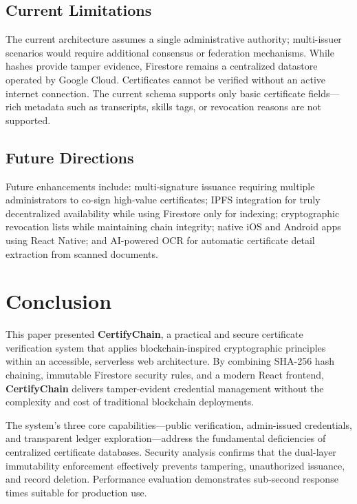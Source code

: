 \documentclass[10pt,twocolumn,a4paper]{article}
\newcommand{\certifychain}{\textbf{CertifyChain}}
\begin{document}
\subsection{Current Limitations}

The current architecture assumes a single administrative authority; multi-issuer scenarios would require additional consensus or federation mechanisms. While hashes provide tamper evidence, Firestore remains a centralized datastore operated by Google Cloud. Certificates cannot be verified without an active internet connection. The current schema supports only basic certificate fields---rich metadata such as transcripts, skills tags, or revocation reasons are not supported.

\subsection{Future Directions}

Future enhancements include: multi-signature issuance requiring multiple administrators to co-sign high-value certificates; IPFS integration for truly decentralized availability while using Firestore only for indexing; cryptographic revocation lists while maintaining chain integrity; native iOS and Android apps using React Native; and AI-powered OCR for automatic certificate detail extraction from scanned documents.

\section{Conclusion}

This paper presented \certifychain{}, a practical and secure certificate verification system that applies blockchain-inspired cryptographic principles within an accessible, serverless web architecture. By combining SHA-256 hash chaining, immutable Firestore security rules, and a modern React frontend, \certifychain{} delivers tamper-evident credential management without the complexity and cost of traditional blockchain deployments.

The system's three core capabilities---public verification, admin-issued credentials, and transparent ledger exploration---address the fundamental deficiencies of centralized certificate databases. Security analysis confirms that the dual-layer immutability enforcement effectively prevents tampering, unauthorized issuance, and record deletion. Performance evaluation demonstrates sub-second response times suitable for production use.
\end{document}
